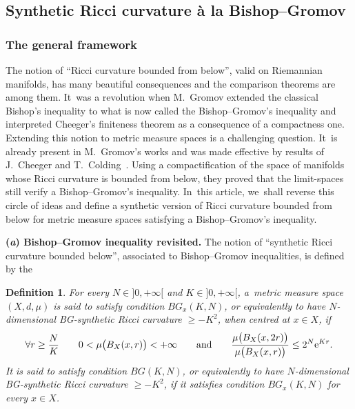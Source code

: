 \documentclass[10pt,a4paper]{amsart}
\numberwithin{equation}{section}
\newtheorem{defi}[theor]{Definition}
\begin{document}
\subsection{Synthetic Ricci curvature \`a la Bishop--Gromov}

\subsubsection{The general framework}\label{generalframe}

The notion of ``Ricci curvature bounded from below'', valid on Riemannian manifolds, has many beautiful consequences and the comparison theorems are among them. It~was a revolution when M.~Gromov extended the classical Bishop's inequality to what is now called the Bishop--Gromov's inequality and interpreted Cheeger's finiteness theorem as a consequence of a compactness one. Extending this notion to metric measure spaces is a challenging question. It~is already present in M.~Gromov's works and was made effective by results of J.~Cheeger and T.~Colding~\cite{CC97, CC00a, CC00b}.
Using a compactification of the space of manifolds whose Ricci curvature is bounded from below, they proved that the limit-spaces still verify a Bishop--Gromov's inequality. In~this article, we~shall reverse this circle of
ideas and define a synthetic version of Ricci curvature bounded from below for metric measure spaces satisfying a Bishop--Gromov's inequality.

\medskip\noindent
{\bf (\emph{a}) Bishop--Gromov inequality revisited.}
The notion of ``synthetic Ricci curvature bounded below'', associated to Bishop--Gromov inequalities, is defined by the

\begin{defi}\label{Riccisynthetic0}
For every $N \in{} ]0, + \infty[$ and $K \in{} ]0, + \infty[$, a~metric measure space $(X,d,\mu)$ is said to satisfy condition $BG_x (K,N)$, or equivalently to
 have $N$-dimensional BG-synthetic Ricci curvature $\ge -K^2$, when centred at $x \in X$, if
\begin{equation}
\label{synthetic0}
\forall r \ge \frac{N}{K}\qquad 0 < \mu \big(B_X(x, r)\big) < +\infty \qquad \text{and} \qquad \frac{\mu \big( B_X(x, 2 r)\big)}{\mu \big( B_X(x,r)\big)} \le
2^{N}{\rm e}^{K r}.
\end{equation}
It is said to satisfy condition $BG (K,N)$, or equivalently to have $N$-dimensional BG-synthetic Ricci curvature $\ge -K^2$, if it satisfies condition
$BG_x (K,N)$ for every $x \in X$.
\end{defi}
\end{document}
